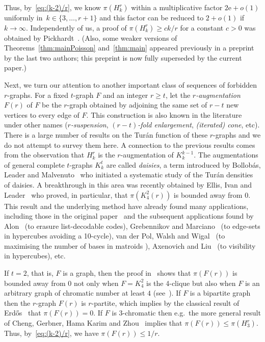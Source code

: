 \documentclass[12pt,a4paper]{article}
\numberwithin{equation}{section}
\theoremstyle{definition}
\theoremstyle{remark}
\newcommand{\me}{\mathrm{e}}
\begin{document}
Thus, by~\eqref{eq:(k-2)/r}, we know $\pi(H_k^r)$ within a multiplicative factor $2\me+o(1)$ uniformly in~$k\in\{3,\dots,r+1\}$ and this factor can be reduced to $2+o(1)$ if $k\to\infty$. Independently of us, a proof of $\pi(H_k^r)\ge ck/r$ for a constant $c>0$ was obtained by Pickhardt~\cite{Pickhardt26}. (Also, some weaker versions of Theorems~\ref{thm:mainPoisson} and~\ref{thm:main} appeared previously  in a preprint~\cite{YangZhu26x} by the last two authors; this preprint is now fully superseded by the current paper.)


Next, we turn our attention to another important class of sequences of forbidden $r$-graphs. 
For a fixed $t$-graph $F$ and an integer $r\ge t$, let the \emph{$r$-augmentation} $F(r)$ of $F$ be the $r$-graph obtained by adjoining the same set of $r-t$ new vertices to every edge of $F$. This construction is also known in the literature under other names (\emph{$r$-suspension}, \emph{$(r-t)$-fold enlargement}, \emph{(iterated) cone}, etc). There is a large number of results on the Tur\'an function of these $r$-graphs and we do not attempt to survey them here. A connection to the previous results comes from the observation that
$H_k^r$ is the $r$-augmentation of $K_{k}^{k-1}$. 
The augmentations of general complete $t$-graphs $K_k^{t}$ are called \emph{daisies}, a term introduced by Bollob\'as, Leader and Malvenuto~\cite{BollobasLeaderMalvenuto11} who initiated a systematic study of the Tur\'an densities of daisies.
A breakthrough in this area was recently obtained by Ellis, Ivan and Leader~\cite[Theorem~4]{EllisIvanLeader24} who proved, in particular, that $\pi(K_{4}^2(r))$ is bounded away from 0.
This result and the underlying method have already found many applications, including those in the original paper~\cite{EllisIvanLeader24} and the subsequent applications found by Alon~\cite{Alon24} (to erasure list-decodable codes),  Grebennikov and Marciano~\cite{GrebennikovMarciano25} (to edge-sets in hypercubes avoiding a 10-cycle), van der Pol, Walsh and Wigal~\cite{PolWalshWigal25} (to maximising the number of bases in matroids%
), Axenovich and Liu~\cite{AxenovichLiu26} (to visibility in hypercubes), etc.

If $t=2$, that is, $F$ is a graph, then the proof in~\cite{EllisIvanLeader24} shows that $\pi(F(r))$ is bounded away from $0$ not only when $F=K_4^2$ is the 4-clique but also when $F$ is an arbitrary graph of chromatic number at least $4$ (see~\cite[Page~3852]{EllisIvanLeader24}). If $F$ is a bipartite graph then the $r$-graph $F(r)$ is $r$-partite, which implies by the classical result of Erd\H os~\cite{Erdos64} that $\pi(F(r))=0$. If $F$ is $3$-chromatic then e.g.\ the more general result of
Cheng, Gerbner, Hama Karim and Zhou~\cite[Theorem 1.2]{ChengGerbnerHamaKarimZhou26} 
implies that $\pi(F(r))\le \pi(H_3^r)$. Thus, by~\eqref{eq:(k-2)/r}, we have $\pi(F(r))\le 1/r$. 
\end{document}
